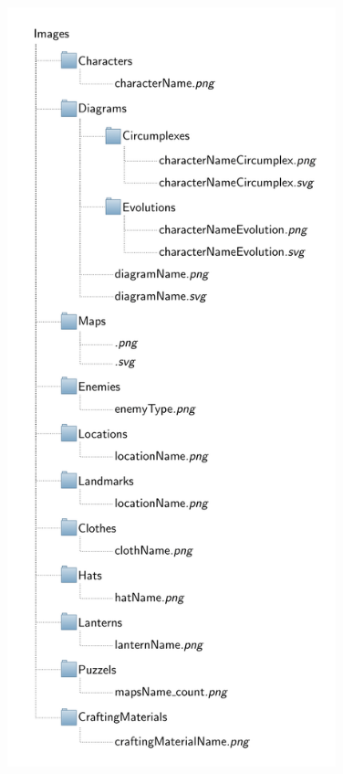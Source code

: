\begin{center}
  \begin{figure}[H]
  \centering
  \includegraphics[height=22cm]{directoryImage}
  \end{figure}
\end{center}

